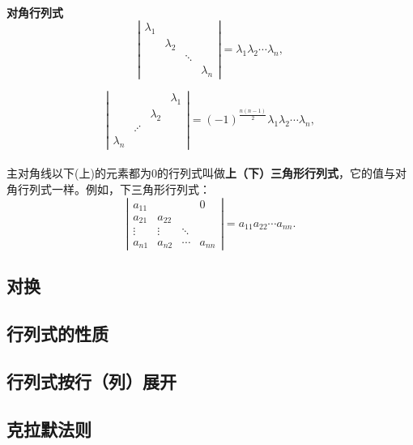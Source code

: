 \paragraph{}
\textbf{对角行列式}
\begin{equation*}
  \left|\begin{array}{cccc}
    \lambda_1 & & & \\
    & \lambda_2 & & \\
    & & \ddots & \\
    & & & \lambda_n
  \end{array}\right| = \lambda_1\lambda_2\cdots \lambda_n,
\end{equation*}

\begin{equation*}
  \left|\begin{array}{cccc}
    & & & \lambda_1 \\
    & & \lambda_2 & \\
    & \iddots & & \\
    \lambda_n & & &
  \end{array}\right| = (-1)^{\frac{n(n-1)}{2}}\lambda_1\lambda_2\cdots \lambda_n,
\end{equation*}

\paragraph{}
主对角线以下(上)的元素都为$0$的行列式叫做\textbf{上（下）三角形行列式}，它的值与对角行列式一样。例如，下三角形行列式：
\begin{equation*}
  \left|\begin{array}{cccc}
    a_{11} & & & 0 \\
    a_{21} & a_{22} & & \\
    \vdots & \vdots & \ddots & \\
    a_{n1} & a_{n2} & \cdots & a_{nn}
  \end{array}\right| = a_{11}a_{22}\cdots a_{nn}.
\end{equation*}

\subsection{对换}

\subsection{行列式的性质}

\subsection{行列式按行（列）展开}

\subsection{克拉默法则}
